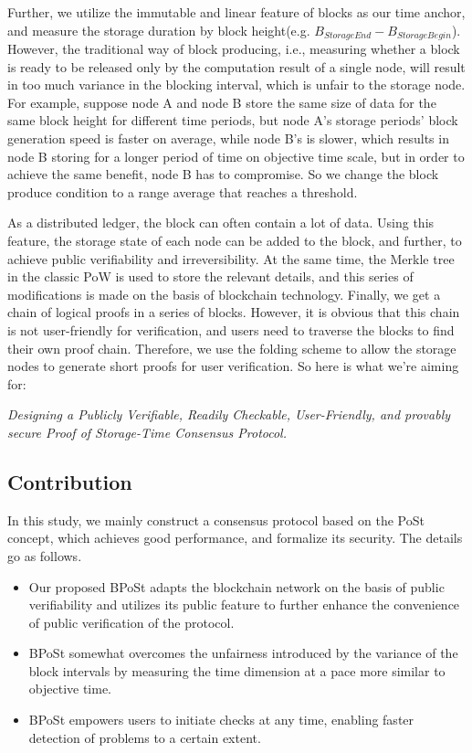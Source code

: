\documentclass[journal]{IEEEtran}
\begin{document}
Further, we utilize the immutable and linear feature of blocks as our time anchor, and measure the storage duration by block height(e.g. $B_{StorageEnd} - B_{StorageBegin}$). However, the traditional way of block producing, i.e., measuring whether a block is ready to be released only by the computation result of a single node, will result in too much variance in the blocking interval, which is unfair to the storage node. For example, suppose node A and node B store the same size of data for the same block height for different time periods, but node A's storage periods' block generation speed is faster on average, while node B's is slower, which results in node B storing for a longer period of time on objective time scale, but in order to achieve the same benefit, node B has to compromise. So we change the block produce condition to a range average that reaches a threshold\cite{2020bobtail}.


As a distributed ledger, the block can often contain a lot of data. Using this feature, the storage state of each node can be added to the block, and further, to achieve public verifiability and irreversibility. At the same time, the Merkle tree in the classic PoW\cite {2008bitcoin} is used to store the relevant details, and this series of modifications is made on the basis of blockchain technology. Finally, we get a chain of logical proofs in a series of blocks. However, it is obvious that this chain is not user-friendly for verification, and users need to traverse the blocks to find their own proof chain. Therefore, we use the folding scheme \cite{2022nova} to allow the storage nodes to generate short proofs for user verification. So here is what we're aiming for:


\textit{Designing a Publicly Verifiable, Readily Checkable, User-Friendly, and provably secure Proof of Storage-Time Consensus Protocol.}


\subsection{Contribution}
In this study, we mainly construct a consensus protocol based on the PoSt concept, which achieves good performance, and formalize its security. The details go as follows.
\begin{itemize}
    \item 
    Our proposed BPoSt adapts the blockchain network on the basis of public verifiability and utilizes its public feature to further enhance the convenience of public verification of the protocol.
    \item 
    BPoSt somewhat overcomes the unfairness introduced by the variance of the block intervals by measuring the time dimension at a pace more similar to objective time.
    \item 
    BPoSt empowers users to initiate checks at any time, enabling faster detection of problems to a certain extent.
\end{itemize}
\end{document}
